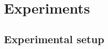 \documentclass[conference]{IEEEtran}
\begin{document}


\vspace{-0.15cm}
\section{Experiments}
\vspace{-0.12cm}

\subsection{Experimental setup} \label{sec:experiment setup}
\vspace{-0.12cm} 
\end{document}
